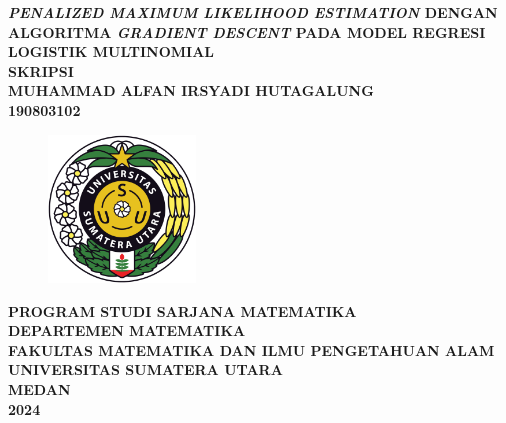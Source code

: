 \pagestyle{empty}
\fontsize{14}{16.8}
\begin{center}
	{\textbf{\textit{PENALIZED MAXIMUM LIKELIHOOD ESTIMATION} DENGAN ALGORITMA \textit{GRADIENT DESCENT} PADA MODEL REGRESI LOGISTIK MULTINOMIAL}}\\
	\vspace{2.0cm}
	{\textbf{SKRIPSI}}\\
	\vspace{1.0cm}
	\textbf{MUHAMMAD ALFAN IRSYADI HUTAGALUNG}\\
	\textbf{190803102}\\
	
	\vspace{1.5cm}
	\begin{figure}[h]
		\centering
		\includegraphics[width=0.35\textwidth]{Gambar/LogoUSU.png}
	\end{figure}
	
	\vfill
	{\textbf{PROGRAM STUDI SARJANA MATEMATIKA}}\\
	{\textbf{DEPARTEMEN MATEMATIKA}}\\
	{\textbf{FAKULTAS MATEMATIKA DAN ILMU PENGETAHUAN ALAM} }\\
	{\textbf{UNIVERSITAS SUMATERA UTARA}}\\
	{\textbf{MEDAN}}\\
	{\textbf{2024}}\\
\end{center}
\cleardoublepage
